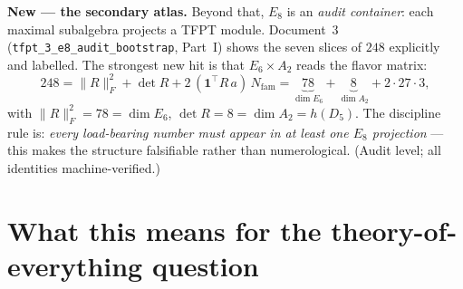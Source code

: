 \documentclass[11pt,a4paper]{article}
\newcommand{\Nfam}{N_{\mathrm{fam}}}
\begin{document}
\noindent\textbf{New --- the secondary atlas.} Beyond that, $E_8$ is an \emph{audit container}: each
maximal subalgebra projects a TFPT module. Document~3 (\texttt{tfpt\_3\_e8\_audit\_bootstrap}, Part~I)
shows the seven slices of $248$ explicitly and labelled. The strongest new hit is that
$E_6\times A_2$ reads the flavor matrix:
\[
  248=\|R\|_F^2+\det R+2\,(\mathbf 1^\top R\,a)\,\Nfam=\underbrace{78}_{\dim E_6}+\underbrace{8}_{\dim A_2}+2\cdot27\cdot3 ,
\]
with $\|R\|_F^2=78=\dim E_6$, $\det R=8=\dim A_2=h(D_5)$. The discipline rule is: \emph{every load-bearing
number must appear in at least one $E_8$ projection} --- this makes the structure falsifiable rather than
numerological. (Audit level; all identities machine-verified.)

\section{What this means for the theory-of-everything question}
\needspace{0.46\textheight}
\end{document}
